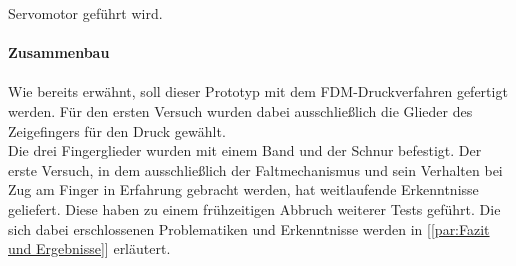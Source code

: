 \documentclass[titlepage,12pt,twoside]{article}
\begin{document}
Servomotor geführt wird. \\
\\
\textbf{Zusammenbau} \\
\\
Wie bereits erwähnt, soll dieser Prototyp mit dem FDM-Druckverfahren gefertigt 
werden. Für den ersten Versuch wurden dabei ausschließlich die Glieder des 
Zeigefingers für den Druck gewählt. \\
Die drei Fingerglieder wurden mit einem Band und der Schnur befestigt. 
Der erste Versuch, in dem ausschließlich der Faltmechanismus und sein 
Verhalten bei Zug am Finger in Erfahrung gebracht werden, hat weitlaufende 
Erkenntnisse geliefert. Diese haben zu einem frühzeitigen Abbruch weiterer 
Tests geführt. Die sich dabei erschlossenen Problematiken und Erkenntnisse 
werden in [\textcolor{blue}{\autoref{par:Fazit und Ergebnisse}}] erläutert. \\
\newpage
\end{document}
